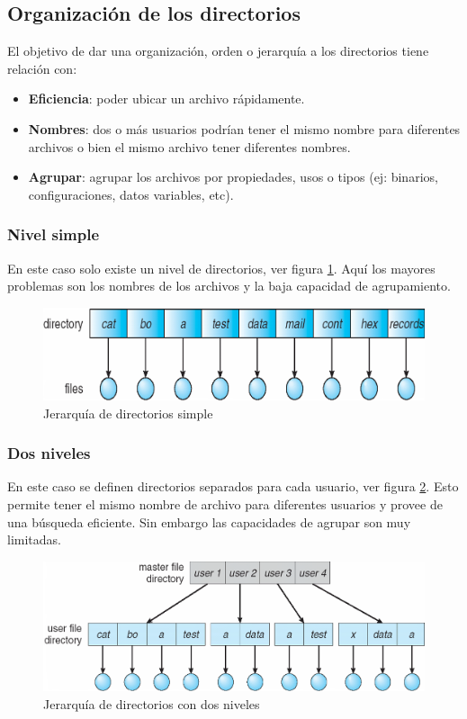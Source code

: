 \subsection{Organización de los directorios}
El objetivo de dar una organización, orden o jerarquía a los directorios tiene
relación con:

\begin{itemize}
	\item \textbf{Eficiencia}: poder ubicar un archivo rápidamente.
	\item \textbf{Nombres}: dos o más usuarios podrían tener el mismo nombre
para diferentes archivos o bien el mismo archivo tener diferentes nombres.
	\item \textbf{Agrupar}: agrupar los archivos por propiedades, usos o
tipos (ej: binarios, configuraciones, datos variables, etc).
\end{itemize}

\subsubsection{Nivel simple}
En este caso solo existe un nivel de directorios, ver figura
\ref{fig:jerarquia_nivel_simple}. Aquí los mayores problemas son los nombres de
los archivos y la baja capacidad de agrupamiento.

\begin{figure}[htbp]
\centering
\includegraphics[scale=0.5]{img/C08_disco/jerarquia_nivel_simple.png}
\caption{Jerarquía de directorios simple}
\label{fig:jerarquia_nivel_simple}
\end{figure}

\subsubsection{Dos niveles}
En este caso se definen directorios separados para cada usuario, ver figura
\ref{fig:jerarquia_dos_niveles}. Esto permite tener el mismo nombre de archivo
para diferentes usuarios y provee de una búsqueda eficiente. Sin embargo las
capacidades de agrupar son muy limitadas.

\begin{figure}[htbp]
\centering
\includegraphics[scale=0.5]{img/C08_disco/jerarquia_dos_niveles.png}
\caption{Jerarquía de directorios con dos niveles}
\label{fig:jerarquia_dos_niveles}
\end{figure}

